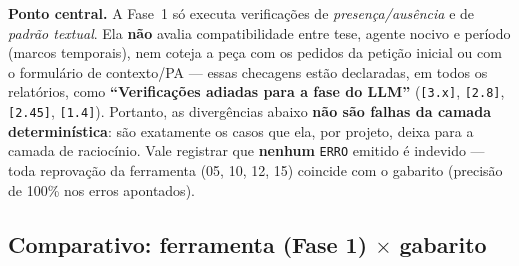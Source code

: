 \documentclass[12pt,a4paper]{article}
\newcommand{\status}[1]{\texttt{#1}}
\begin{document}
\medskip
\noindent\textbf{Ponto central.} A Fase~1 só executa verificações de
\emph{presença/ausência} e de \emph{padrão textual}. Ela \textbf{não} avalia
compatibilidade entre tese, agente nocivo e período (marcos temporais), nem
coteja a peça com os pedidos da petição inicial ou com o formulário de
contexto/PA --- essas checagens estão declaradas, em todos os relatórios, como
\textbf{``Verificações adiadas para a fase do LLM''} (\texttt{[3.x]},
\texttt{[2.8]}, \texttt{[2.45]}, \texttt{[1.4]}). Portanto, as divergências
abaixo \textbf{não são falhas da camada determinística}: são exatamente os casos
que ela, por projeto, deixa para a camada de raciocínio. Vale registrar que
\textbf{nenhum} \status{ERRO} emitido é indevido --- toda reprovação da
ferramenta (05, 10, 12, 15) coincide com o gabarito (precisão de 100\% nos erros
apontados).

\subsection*{Comparativo: ferramenta (Fase 1) $\times$ gabarito}
\end{document}
